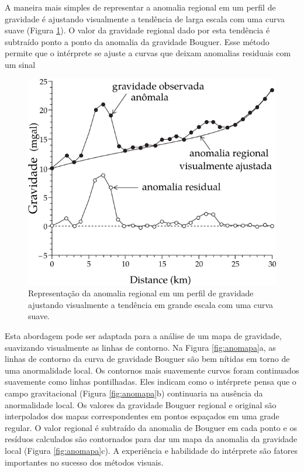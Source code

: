 \documentclass[]{book}
\theoremstyle{definition}
\theoremstyle{definition}
\theoremstyle{definition}
\theoremstyle{remark}
\begin{document}
A maneira mais simples de representar a anomalia regional em um perfil de gravidade é ajustando visualmente a tendência de larga escala com uma curva suave (Figura \ref{fig:anoreg}). O valor da gravidade regional dado por esta tendência é subtraído ponto a ponto da anomalia da gravidade Bouguer. Esse método permite que o intérprete se ajuste a curvas que deixam anomalias residuais com um sinal

\begin{figure}

{\centering \includegraphics[width=0.8\linewidth]{fig/Fig_02.37} 

}

\caption{Representação da anomalia regional em um perfil de gravidade ajustando visualmente a tendência em grande escala com uma curva suave.}\label{fig:anoreg}
\end{figure}

Esta abordagem pode ser adaptada para a análise de um mapa de gravidade, suavizando visualmente as linhas de contorno. Na Figura \ref{fig:anomapa}a, as linhas de contorno da curva de gravidade Bouguer são bem nítidas em torno de uma anormalidade local. Os contornos mais suavemente curvos foram continuados suavemente como linhas pontilhadas. Eles indicam como o intérprete pensa que o campo gravitacional (Figura \ref{fig:anomapa}b) continuaria na ausência da anormalidade local. Os valores da gravidade Bouguer regional e original são interpolados dos mapas correspondentes em pontos espaçados em uma grade regular. O valor regional é subtraído da anomalia de Bouguer em cada ponto e os resíduos calculados são contornados para dar um mapa da anomalia da gravidade local (Figura \ref{fig:anomapa}c). A experiência e habilidade do intérprete são fatores importantes no sucesso dos métodos visuais.
\end{document}
